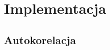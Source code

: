 \documentclass[12pt,a4paper,twoside]{mwart}
\begin{document}




\section{Implementacja}\label{sec:impl}

\subsection{Autokorelacja}\label{sec:impl:alg:ac}
\end{document}
